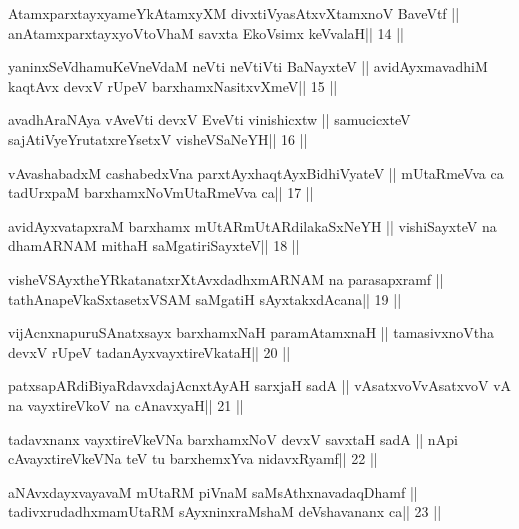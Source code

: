 \begin{shl}
AtamxparxtayxyameYkAtamxyXM divxtiVyasAtxvXtamxnoV BaveVtf ||
anAtamxparxtayxyoV\s toV\s haM savxta EkoV\s simx keVvalaH\hfill || 14 ||
\end{shl}

\begin{shl}
yaninxSeVdhamuKeVneVdaM neVti neVtiVti BaNayxteV ||
avidAyxmavadhiM kaqtAvx devxV rUpeV barxhamxNasitxvXmeV\hfill || 15 ||
\end{shl}

\begin{shl}
avadhAraNAya vAveVti devxV EveVti vinishicxtw ||
samucicxteV sajAtiVyeYrutatxreYsetxV visheVSaNeYH\hfill || 16 ||
\end{shl}

\begin{shl}
vAvashabadxM cashabedxVna parxtAyxhaqtAyxBidhiVyateV ||
mUtaRmeVva ca tadUrxpaM barxhamxNoV\s mUtaRmeVva ca\hfill || 17 ||
\end{shl}

\begin{shl}
avidAyxvatapxraM barxhamx mUtARmUtARdilakaSxNeYH ||
vishiSayxteV na dhamARNAM mithaH saMgatiriSayxteV\hfill || 18 ||
\end{shl}

\begin{shl}
visheVSAyxtheYRkatanatxrXtAvxdadhxmARNAM na parasapxramf ||
tathA\s napeVkaSxtasetxVSAM saMgatiH sAyxtakxdAcana\hfill || 19 ||
\end{shl}

\begin{shl}
vijAcnxnapuruSAnatxsayx barxhamxNaH paramAtamxnaH ||
tamasivxnoV\s tha devxV rUpeV tadanAyxvayxtireVkataH\hfill || 20 ||
\end{shl}

\begin{shl}
patxsapARdiBiyaRdavxdajAcnxtAyAH sarxjaH sadA ||
vAsatxvoV\s vAsatxvoV vA na vayxtireVkoV na cAnavxyaH\hfill || 21 ||
\end{shl}

\begin{shl}
tadavxnanx vayxtireVkeVNa barxhamxNoV devxV savxtaH sadA ||
nApi cAvayxtireVkeVNa teV tu barxhemxYva nidavxRyamf\hfill || 22 ||
\end{shl}

\begin{shl}
aNAvxdayxvayavaM mUtaRM piVnaM saMsAthxnavadaqDhamf ||
tadivxrudadhxmamUtaRM sAyxninxraMshaM deVshavananx ca\hfill || 23 ||
\end{shl}

